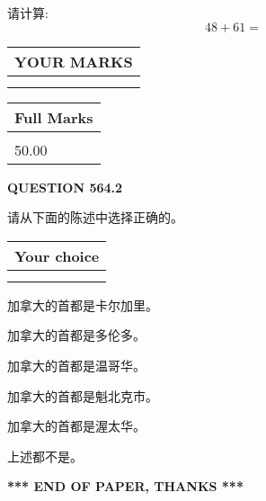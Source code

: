 \documentclass{ctexart}
\begin{document}
  
 
请计算:
\begin{equation}
48 +  %
61 = \nonumber
\end{equation}
 

 

 
  
\vspace{0.2in}
  
\noindent\begin{tabular}{|l|}
\hline
 YOUR MARKS  \\
\hline
 \\ 
 \\ 
\hline
\end{tabular}
\hspace{0.05in} \begin{tabular}{|l|}
\hline
 Full Marks  \\
\hline
 \\ 
50.00 \\
\hline
\end{tabular}
{\textbf{\Large{QUESTION
564.2 
}}}
  
  
请从下面的陈述中选择正确的。
  
  
\noindent\hspace{3.0in} \begin{tabular}{|l|}
\hline
Your choice \\
\hline
 \\ 
 \\ 
\hline
\end{tabular}
  
  
 
 
加拿大的首都是卡尔加里。
 
 
加拿大的首都是多伦多。
 
 
加拿大的首都是温哥华。
 
 
加拿大的首都是魁北克市。
 
 
加拿大的首都是渥太华。
 
 
 上述都不是。
 
 
   
   
 \vspace{0.2in}
 
   
   
   
   
\vspace{1.0in} 
{\textbf{\large{ *** END OF PAPER, THANKS *** }}} 
   
\end{document}
